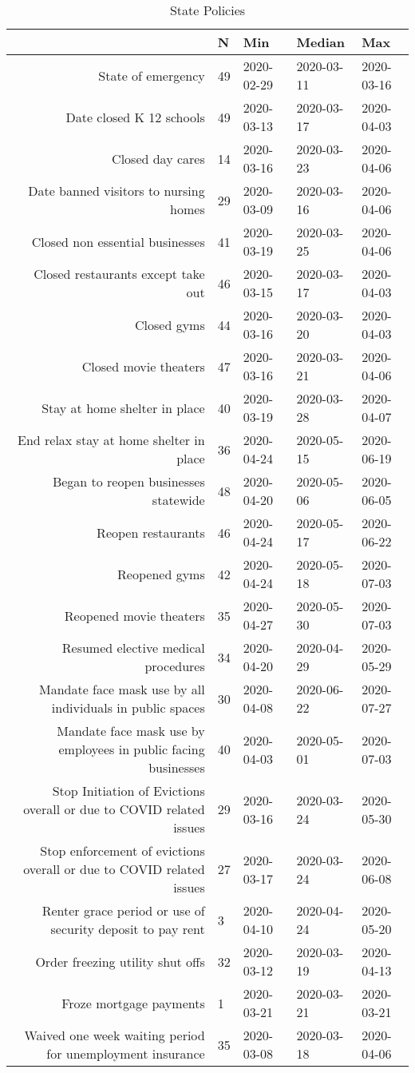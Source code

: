 \begin{table}[ht]
\centering
\begin{tabular}{rllll}
  \hline
 & N & Min & Median & Max \\ 
  \hline
State of emergency & 49 & 2020-02-29 & 2020-03-11 & 2020-03-16 \\ 
  Date closed K 12 schools & 49 & 2020-03-13 & 2020-03-17 & 2020-04-03 \\ 
  Closed day cares & 14 & 2020-03-16 & 2020-03-23 & 2020-04-06 \\ 
  Date banned visitors to nursing homes & 29 & 2020-03-09 & 2020-03-16 & 2020-04-06 \\ 
  Closed non essential businesses & 41 & 2020-03-19 & 2020-03-25 & 2020-04-06 \\ 
  Closed restaurants except take out & 46 & 2020-03-15 & 2020-03-17 & 2020-04-03 \\ 
  Closed gyms & 44 & 2020-03-16 & 2020-03-20 & 2020-04-03 \\ 
  Closed movie theaters & 47 & 2020-03-16 & 2020-03-21 & 2020-04-06 \\ 
  Stay at home  shelter in place & 40 & 2020-03-19 & 2020-03-28 & 2020-04-07 \\ 
  End relax stay at home shelter in place & 36 & 2020-04-24 & 2020-05-15 & 2020-06-19 \\ 
  Began to reopen businesses statewide & 48 & 2020-04-20 & 2020-05-06 & 2020-06-05 \\ 
  Reopen restaurants & 46 & 2020-04-24 & 2020-05-17 & 2020-06-22 \\ 
  Reopened gyms & 42 & 2020-04-24 & 2020-05-18 & 2020-07-03 \\ 
  Reopened movie theaters & 35 & 2020-04-27 & 2020-05-30 & 2020-07-03 \\ 
  Resumed elective medical procedures & 34 & 2020-04-20 & 2020-04-29 & 2020-05-29 \\ 
  Mandate face mask use by all individuals in public spaces & 30 & 2020-04-08 & 2020-06-22 & 2020-07-27 \\ 
  Mandate face mask use by employees in public facing businesses & 40 & 2020-04-03 & 2020-05-01 & 2020-07-03 \\ 
  Stop Initiation of Evictions overall or due to COVID related issues & 29 & 2020-03-16 & 2020-03-24 & 2020-05-30 \\ 
  Stop enforcement of evictions overall or due to COVID related issues & 27 & 2020-03-17 & 2020-03-24 & 2020-06-08 \\ 
  Renter grace period or use of security deposit to pay rent & 3 & 2020-04-10 & 2020-04-24 & 2020-05-20 \\ 
  Order freezing utility shut offs & 32 & 2020-03-12 & 2020-03-19 & 2020-04-13 \\ 
  Froze mortgage payments & 1 & 2020-03-21 & 2020-03-21 & 2020-03-21 \\ 
  Waived one week waiting period for unemployment insurance & 35 & 2020-03-08 & 2020-03-18 & 2020-04-06 \\ 
   \hline
\end{tabular}
\caption{State Policies \label{tab:policies}} 
\end{table}
